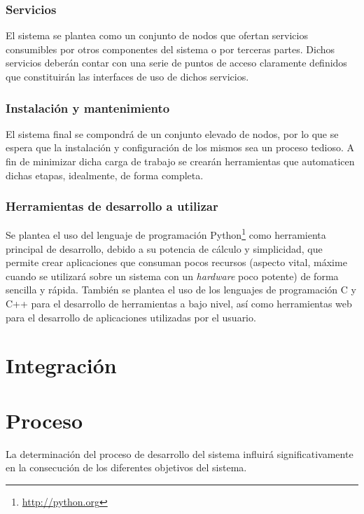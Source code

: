 \subsubsection{Servicios}

El sistema se plantea como un conjunto de nodos que ofertan servicios consumibles por otros componentes del sistema o por terceras partes. Dichos servicios deberán contar con una serie de puntos de acceso claramente definidos que constituirán las interfaces de uso de dichos servicios.

\subsubsection{Instalación y mantenimiento}

El sistema final se compondrá de un conjunto elevado de nodos, por lo que se espera que la instalación y configuración de los mismos sea un proceso tedioso. A fin de minimizar dicha carga de trabajo se crearán herramientas que automaticen dichas etapas, idealmente, de forma completa.

\subsubsection{Herramientas de desarrollo a utilizar}

Se plantea el uso del lenguaje de programación Python\footnote{\href{http://www.python.org}{http://python.org}} como herramienta principal de desarrollo, debido a su potencia de cálculo y simplicidad, que permite crear aplicaciones que consuman pocos recursos (aspecto vital, máxime cuando se utilizará sobre un sistema con un \textit{hardware} poco potente) de forma sencilla y rápida. También se plantea el uso de los lenguajes de programación C y C++ para el desarrollo de herramientas a bajo nivel, así como herramientas web para el desarrollo de aplicaciones utilizadas por el usuario.

\section{Integración}
\citationneeded[]
\section{Proceso}

La determinación del proceso de desarrollo del sistema influirá significativamente en la consecución de los diferentes objetivos del sistema.

